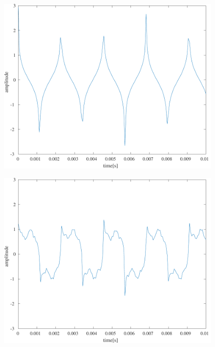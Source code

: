 \begin{figure}[H]
\begin{minipage}[b]{.24\textwidth}
    \end{minipage}
    \begin{minipage}[b]{.24\textwidth}
        \centering
        \label{fig:実験結果矩形波_p2PI}
        \includegraphics[keepaspectratio,width=\textwidth]{../../Figures/03_13.pdf}
    \end{minipage}
    \begin{minipage}[b]{.24\textwidth}
        \centering
        \label{fig:実験結果矩形波_rand}
        \includegraphics[keepaspectratio,width=\textwidth]{../../Figures/03_14.pdf}

\end{minipage}
\end{figure}
